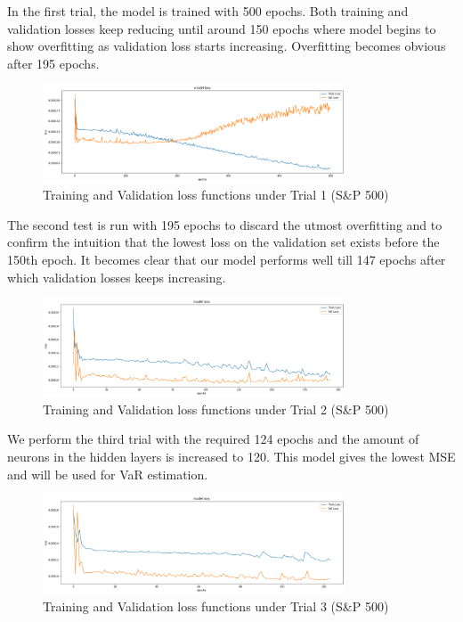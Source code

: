 \documentclass[a4paper,11pt,oneside]{book}
\begin{document}
In the first trial, the model is trained with 500 epochs. Both training and validation losses keep reducing until around 150 epochs where model begins to show overfitting as validation loss starts increasing. Overfitting becomes obvious after 195 epochs.\newline
\begin{figure}[!h]
	\centering
	\includegraphics[width=0.8\textwidth]{figures/sanp1}
	\caption{Training and Validation loss functions under Trial 1 (S\&P 500)}
	\label{sanp1}
\end{figure}
\newline The second test is run with 195 epochs to discard the utmost overfitting and to confirm the intuition that the lowest loss on the validation set exists
before the 150th epoch. It becomes clear that our model performs well till 147 epochs after which validation losses keeps increasing.  
\begin{figure}[!h]
	\centering
	\includegraphics[width=0.8\textwidth]{figures/sanp2}
	\caption{Training and Validation loss functions under Trial 2 (S\&P 500)}
	\label{sanp2}
\end{figure}
 We perform the third trial with the required 124 epochs and the amount of neurons in the hidden layers is increased to 120. This model gives the lowest MSE and will be used for VaR estimation.\newline
\begin{figure}[!h]
	\centering
	\includegraphics[width=0.8\textwidth]{figures/sanp3}
	\caption{Training and Validation loss functions under Trial 3 (S\&P 500)}
	\label{sanp3}
\end{figure}
\end{document}
